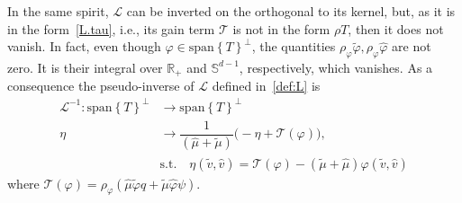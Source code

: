 \documentclass[a4paper]{article}
\theoremstyle{Theorem}\newtheorem{proposition}{Proposition}[section]
\theoremstyle{Remark}\newtheorem{remark}{Remark}[section]
\theoremstyle{Theorem}\newtheorem{theorem}{Theorem}[section]
\newcommand{\R}{\mathbb{R}}
\newcommand{\hv}{\hat{v}}
\newcommand{\tv}{\tilde{v}}
\newcommand{\hphi}{\hat{\varphi}}
\newcommand{\tphi}{\tilde{\varphi}}
\newcommand{\hmu}{\hat{\mu}}
\newcommand{\tmu}{\tilde{\mu}}
\begin{document}
In the same spirit, $\mathcal{L}$ can be inverted on the orthogonal to its kernel, but, as it is in the form~\eqref{L.tau}, i.e., its gain term $\mathcal{T}$ is not in the form $\rho T$, then it does not vanish. In fact, even though $\varphi \in \text{span}\left\lbrace T\right\rbrace^{\bot}$, the quantities $\rho_\varphi\tphi, \rho_\varphi\hphi$ are not zero. It is their integral over $\R_+$ and $\mathbb{S}^{d-1}$, respectively, which vanishes.
As a consequence the pseudo-inverse of $\mathcal{L}$ defined in~\eqref{def:L} is
\begin{equation}\label{pseudo.inv.L}
\begin{split}
    \mathcal{L}^{-1}:  \text{span}\left\lbrace T\right\rbrace^{\bot} &\to \text{span}\left\lbrace T\right\rbrace^{\bot}\\
    \eta &\to \dfrac{1}{(\hmu+\tmu)}\Big(-\eta+\mathcal{T}(\varphi) \Big),
    \\ &\text{s.t.}\quad  \eta(\tv,\hv)=\mathcal{T}(\varphi)-(\tmu+\hmu)\varphi(\tv,\hv)
    \end{split}
\end{equation}
where $\mathcal{T}(\varphi)=\rho_\varphi(\hmu\tphi q +\tmu\hphi \psi)$. 
\end{document}
